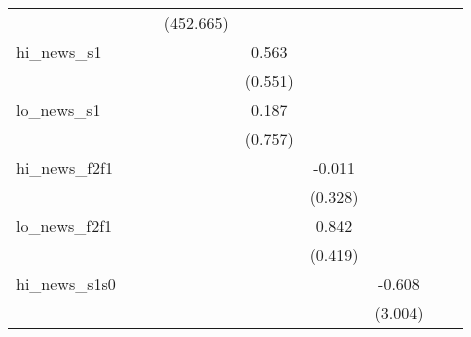 {\begin{tabular}{l*{8}{c}}
            &                     &                     &   (452.665)         &                     &                     &                     &                     &                     \\
\addlinespace
hi\_news\_s1  &                     &                     &                     &       0.563         &                     &                     &                     &                     \\
            &                     &                     &                     &     (0.551)         &                     &                     &                     &                     \\
\addlinespace
lo\_news\_s1  &                     &                     &                     &       0.187         &                     &                     &                     &                     \\
            &                     &                     &                     &     (0.757)         &                     &                     &                     &                     \\
\addlinespace
hi\_news\_f2f1&                     &                     &                     &                     &      -0.011         &                     &                     &                     \\
            &                     &                     &                     &                     &     (0.328)         &                     &                     &                     \\
\addlinespace
lo\_news\_f2f1&                     &                     &                     &                     &       0.842\sym{**} &                     &                     &                     \\
            &                     &                     &                     &                     &     (0.419)         &                     &                     &                     \\
\addlinespace
hi\_news\_s1s0&                     &                     &                     &                     &                     &      -0.608         &                     &                     \\
            &                     &                     &                     &                     &                     &     (3.004)         &                     &                     \\

\end{tabular}}
